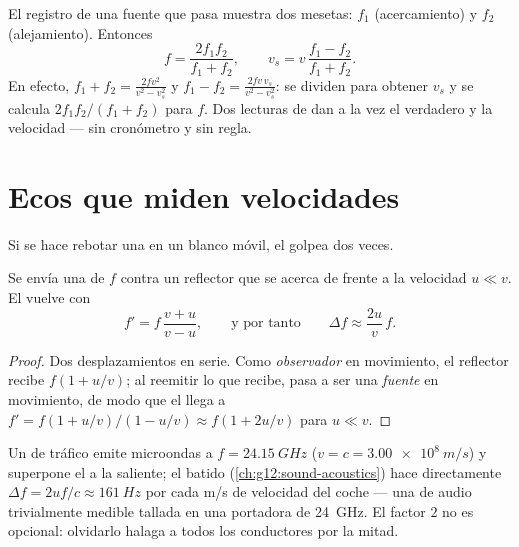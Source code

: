 \begin{method}\label{met:g12:doppler-effect:pass}
El registro de una fuente que pasa muestra dos mesetas: $f_1$
(acercamiento) y $f_2$ (alejamiento). Entonces
\[
f = \frac{2 f_1 f_2}{f_1 + f_2}, \qquad
v_s = v\,\frac{f_1 - f_2}{f_1 + f_2}.
\]
En efecto, $f_1 + f_2 = \frac{2fv^2}{v^2 - v_s^2}$ y
$f_1 - f_2 = \frac{2fv\,v_s}{v^2 - v_s^2}$: se dividen para obtener
$v_s$ y se calcula $2f_1 f_2/(f_1 + f_2)$ para $f$. Dos lecturas de
 dan a la vez el  verdadero y la velocidad --- sin
cronómetro y sin regla.
\end{method}

\section{Ecos que miden velocidades}

Si se hace rebotar una  en un blanco móvil, el 
golpea dos veces.

\begin{proposition}\label{prop:g12:doppler-effect:double}
Se envía una  de  $f$ contra un reflector que se acerca de
frente a la velocidad $u \ll v$. El  vuelve con
\[ f' = f\,\frac{v + u}{v - u}, \qquad \text{y por tanto} \qquad \Delta f \approx \frac{2u}{v}\,f . \]
\end{proposition}

\begin{proof}
Dos desplazamientos en serie. Como \emph{observador} en movimiento, el
reflector recibe $f(1 + u/v)$; al reemitir lo que recibe, pasa a ser una
\emph{fuente} en movimiento, de modo que el  llega a
$f' = f(1 + u/v)/(1 - u/v) \approx f(1 + 2u/v)$ para $u \ll v$.
\end{proof}

\begin{example}\label{ex:g12:doppler-effect:radar}
Un  de tráfico emite microondas a $f = \qty{24.15}{GHz}$
($v = c = \qty{3.00e8}{m/s}$) y superpone el  a la  saliente; el
batido (\cref{ch:g12:sound-acoustics}) hace  directamente
$\Delta f = 2uf/c \approx \qty{161}{Hz}$ por cada \unit{m/s} de
velocidad del coche --- una  de audio trivialmente medible
tallada en una portadora de \qty{24}{GHz}. El factor $2$ no es
opcional: olvidarlo halaga a todos los conductores por la mitad.
\end{example}


